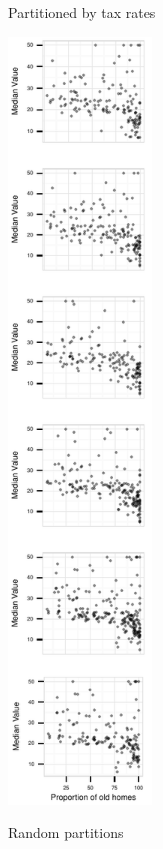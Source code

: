 \begin{figure}
\begin{subfigure}[t]{1.5in}
	\caption{Partitioned by tax rates}
	 \label{fig:method_actual}
    \end{subfigure}
    \begin{subfigure}[t]{1.5in}
 	 \includegraphics[width=1.5in]{images/randCluster.pdf}
	 \label{fig:method_random}
     \vspace{-0.37cm}
 	\caption{Random partitions}
    \end{subfigure}
     \begin{subfigure}[t]{2.5in}

\end{subfigure}
\end{figure}
